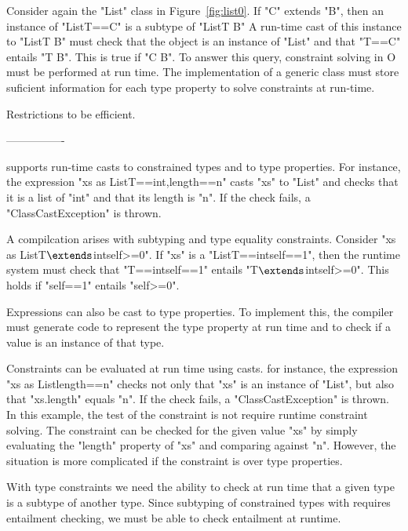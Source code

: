 Consider again the \xcd"List" class in Figure~\ref{fig:list0}.
If \xcd"C" extends \xcd"B", then an instance of
\xcd"List{T==C}" is a subtype of 
\xcd"List{T \extends B}"
A run-time cast of this instance to
\xcd"List{T \extends B}"
must check
that the object is an instance of \xcd"List"
and that \xcd"T==C" entails \xcd"T \extends B".
This is true if \xcd"C \extends B".
To answer this query,
constraint solving in {\cal O} must be performed at 
run time.
The implementation of a generic class must store suficient
information for each type property to solve constraints at
run-time.

Restrictions to be efficient.

----------------

\Xten{} supports run-time casts to constrained types and to type properties.
For instance, the expression
        \xcd"xs as List{T==int,length==n}" casts \xcd"xs" to  
        \xcd"List" and checks that it is a list of \xcd"int" and that
        its length is \xcd"n".
        If the check fails, a \xcd"ClassCastException"
        is thrown.  

A compilcation arises with subtyping and type equality constraints.
        Consider
        \xcdmath"xs as List{T$\extends$int{self>=0}}".
        If \xcd"xs" is a \xcd"List{T==int{self==1}}",
        then the runtime system must check that
                         \xcd"T==int{self==1}" entails
                       \xcdmath"T$\extends$int{self>=0}".
                       This holds if \xcd"self==1" entails \xcd"self>=0".

Expressions can also be cast to type properties.  To implement this,
the compiler must generate code to represent the type property at
run time and to check if a value is an instance of that type.

Constraints can be evaluated at run time using casts.
 for instance, the expression 
        \xcd"xs as List{length==n}" checks not only 
        that \xcd"xs"
         is an instance of
        \xcd"List", but also that \xcd"xs.length" equals \xcd"n".
        If the check fails, a \xcd"ClassCastException"
        is thrown.  
In this example, the test of the constraint is not require runtime constraint
solving.  The constraint can be checked for the given value \xcd"xs"  by simply
evaluating the \xcd"length" property of \xcd"xs" and comparing against \xcd"n".
However, the situation is more complicated if the constraint  is over type
properties.

With type constraints we need the ability to check at run time that a given
type is a subtype of another type.  Since subtyping of constrained types with
requires entailment checking, we must be able to check entailment at runtime.

